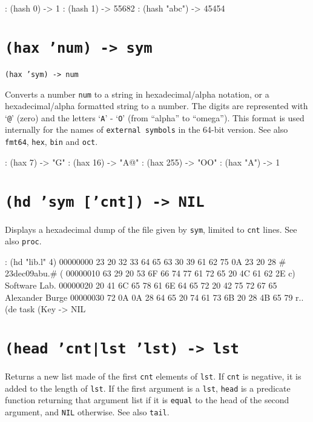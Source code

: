 \begin{wideverbatim}
: (hash 0)
-> 1
: (hash 1)
-> 55682
: (hash "abc")
-> 45454
\end{wideverbatim}

 
\section*{\texttt{(hax 'num) -> sym}}
\label{sec:func-ref-H-(hax 'num) -> sym}


\texttt{(hax 'sym) -> num}

Converts a number \texttt{num} to a string in hexadecimal/alpha
notation, or a hexadecimal/alpha formatted string to a number. The
digits are represented with `\texttt{@}' (zero) and the letters
`\texttt{A}' - `\texttt{O}' (from ``alpha'' to ``omega''). This format
is used internally for the names of \texttt{external symbols} in the
64-bit version. See also \texttt{fmt64}, \texttt{hex}, \texttt{bin}
and \texttt{oct}.


\begin{wideverbatim}
: (hax 7)
-> "G"
: (hax 16)
-> "A@"
: (hax 255)
-> "OO"
: (hax "A")
-> 1
\end{wideverbatim}

 
\section*{\texttt{(hd 'sym ['cnt]) -> NIL}}
\label{sec:func-ref-H-(hd 'sym ['cnt]) -> NIL}


Displays a hexadecimal dump of the file given by \texttt{sym}, limited to \texttt{cnt}
lines. See also \texttt{proc}.


\begin{wideverbatim}
:  (hd "lib.l" 4)
00000000  23 20 32 33 64 65 63 30 39 61 62 75 0A 23 20 28  # 23dec09abu.# (
00000010  63 29 20 53 6F 66 74 77 61 72 65 20 4C 61 62 2E  c) Software Lab.
00000020  20 41 6C 65 78 61 6E 64 65 72 20 42 75 72 67 65   Alexander Burge
00000030  72 0A 0A 28 64 65 20 74 61 73 6B 20 28 4B 65 79  r..(de task (Key
-> NIL
\end{wideverbatim}

 
\section*{\texttt{(head 'cnt|lst 'lst) -> lst}}
\label{sec:func-ref-H-(head 'cnt|lst 'lst) -> lst}


Returns a new list made of the first \texttt{cnt} elements of \texttt{lst}. If \texttt{cnt}
is negative, it is added to the length of \texttt{lst}. If the first argument
is a \texttt{lst}, \texttt{head} is a predicate function returning that argument list
if it is \texttt{equal} to the head of the second argument, and \texttt{NIL}
otherwise. See also \texttt{tail}.


